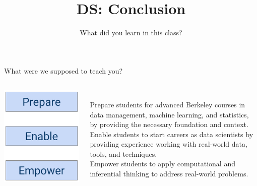 \documentclass[aspectratio=169]{../latex_main/tntbeamer}  %
\title[Introduction]{DS: Conclusion}
\subtitle{What did you learn in this class?}
\begin{document}
	
	\maketitle
	\begin{frame}{What were we supposed to teach you?}
	    \begin{columns}
	      \begin{column}{.3\textwidth}
	            \begin{center}
	                \includegraphics[scale=.4]{Bild1}
	            \end{center}
	                
	       \end{column}
	       
	       \begin{column}{.7\textwidth}
	           \\\bigskip
	           Prepare students for advanced Berkeley courses in data management, machine learning, and statistics, by providing the necessary foundation and context.\\
	           \bigskip
	           \smallskip
	           Enable students to start careers as data scientists by providing experience working with real-world data, tools, and techniques.\\
	           \bigskip
	           \bigskip
	           \medskip
	           \medskip
	           Empower students to apply computational and inferential thinking to address real-world problems.
	       \end{column}
        \end{columns}

	\end{frame}
	
\end{document}
